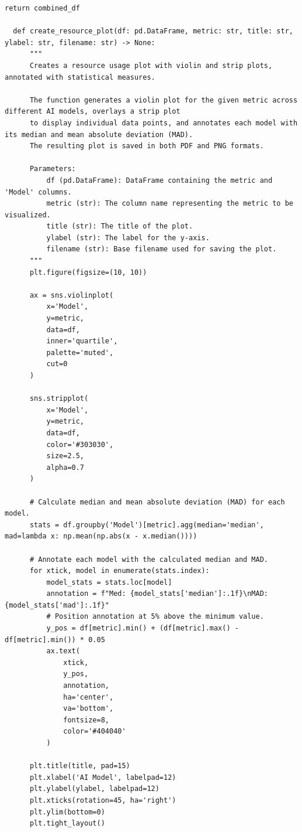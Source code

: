 \begin{lstlisting}[style=Python, caption={Python-quantitative-data-analysis}, captionpos=b]
      return combined_df
  
  def create_resource_plot(df: pd.DataFrame, metric: str, title: str, ylabel: str, filename: str) -> None:
      """
      Creates a resource usage plot with violin and strip plots, annotated with statistical measures.
      
      The function generates a violin plot for the given metric across different AI models, overlays a strip plot
      to display individual data points, and annotates each model with its median and mean absolute deviation (MAD).
      The resulting plot is saved in both PDF and PNG formats.
      
      Parameters:
          df (pd.DataFrame): DataFrame containing the metric and 'Model' columns.
          metric (str): The column name representing the metric to be visualized.
          title (str): The title of the plot.
          ylabel (str): The label for the y-axis.
          filename (str): Base filename used for saving the plot.
      """
      plt.figure(figsize=(10, 10))
      
      ax = sns.violinplot(
          x='Model',
          y=metric,
          data=df,
          inner='quartile',
          palette='muted',
          cut=0
      )
      
      sns.stripplot(
          x='Model',
          y=metric,
          data=df,
          color='#303030',
          size=2.5,
          alpha=0.7
      )
      
      # Calculate median and mean absolute deviation (MAD) for each model.
      stats = df.groupby('Model')[metric].agg(median='median', mad=lambda x: np.mean(np.abs(x - x.median())))
      
      # Annotate each model with the calculated median and MAD.
      for xtick, model in enumerate(stats.index):
          model_stats = stats.loc[model]
          annotation = f"Med: {model_stats['median']:.1f}\nMAD: {model_stats['mad']:.1f}"
          # Position annotation at 5% above the minimum value.
          y_pos = df[metric].min() + (df[metric].max() - df[metric].min()) * 0.05
          ax.text(
              xtick,
              y_pos,
              annotation,
              ha='center',
              va='bottom',
              fontsize=8,
              color='#404040'
          )
      
      plt.title(title, pad=15)
      plt.xlabel('AI Model', labelpad=12)
      plt.ylabel(ylabel, labelpad=12)
      plt.xticks(rotation=45, ha='right')
      plt.ylim(bottom=0)
      plt.tight_layout()
      

\end{lstlisting}
